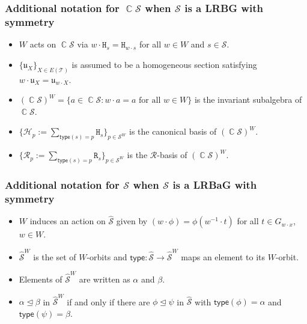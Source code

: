 \documentclass[11pt, oneside, reqno]{amsart}
\theoremstyle{definition}
\numberwithin{equation}{section}
\DeclareMathOperator{\C}{\mathbb{C}}
\def \SS{{\mathcal{S}}}
\def \TT{{\mathcal{T}}}
\def \kk{\C}
\def \uu{{\mathfrak{u}}}
\def \wh{\widehat}
\DeclareMathOperator{\chleq}{\unlhd}
\def \type{\mathsf{type}}
\newcommand{\B}[1]{\mathtt{#1}} 			%
\begin{document}
\subsubsection*{Additional notation for $\kk \SS$ when $\SS$ is a LRBG with symmetry}

\begin{itemize}[wide]
    \item
        $W$ acts on $\kk \SS$ via $w \cdot \B{H}_{s} = \B{H}_{w \cdot s}$ for all $w \in W$ and $s \in \SS$.

    \item
        $\{\uu_{X}\}_{X \in E(\TT)}$ is assumed to be a homogeneous section
        satisfying $w \cdot \uu_{X} = \uu_{w \cdot X}$.

    \item
        $(\kk \SS)^W = \{ a \in \kk \SS : w \cdot a = a \text{~for all~} w \in
        W \}$ is the invariant subalgebra of $\kk \SS$.

    \item
        $\{ \mathcal{H}_p := \sum_{\type(s) = p} \B{H}_{s} \}_{p \in \SS^W}$
        is the canonical basis of $(\kk \SS)^W$.

    \item
        $\{ \mathcal{R}_p := \sum_{\type(s) = p} \B{R}_{s} \}_{p \in \SS^W}$
        is the $\mathcal{R}$-basis of $(\kk \SS)^W$.
\end{itemize}

\subsubsection*{Additional notation for $\SS$ when $\SS$ is a LRBaG with symmetry}

\begin{itemize}[wide]
    \item
        $W$ induces an action on $\wh{\SS}$ given by $(w \cdot \phi) = \phi( w^{-1} \cdot t)$ for all $t \in G_{w \cdot x}$, $w \in W$.

    \item
        $\wh{\SS}^W$ is the set of $W$-orbits and
        $\type: \wh{\SS} \to \wh{\SS}^W$ maps an element to its $W$-orbit.

    \item
        Elements of $\wh{\SS}^W$ are written as $\alpha$ and $\beta$.

    \item
        $\alpha \chleq \beta$ in $\wh{\SS}^W$
        if and only if there are $\phi \chleq \psi$ in $\wh{\SS}$
        with $\type(\phi) = \alpha$ and $\type(\psi) = \beta$.
\end{itemize}
\end{document}
